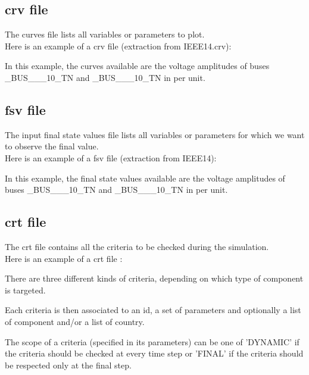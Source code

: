 \documentclass[a4paper, 12pt]{report}
\begin{document}
\subsection{crv file}

The curves file lists all variables or parameters to plot. \\

Here is an example of a crv file (extraction from IEEE14.crv):


In this example, the curves available are the voltage amplitudes of buses \_BUS\_\_\_10\_TN and \_BUS\_\_\_10\_TN in per unit.

\subsection{fsv file}

The input final state values file lists all variables or parameters for which we want to observe the final value. \\

Here is an example of a fsv file (extraction from IEEE14):


In this example, the final state values available are the voltage amplitudes of buses \_BUS\_\_\_10\_TN and \_BUS\_\_\_10\_TN in per unit.

\subsection{crt file}

The crt file contains all the criteria to be checked during the
simulation.
\\

Here is an example of a crt file :


There are three different kinds of criteria, depending on which type of
component is targeted.

Each criteria is then associated to an id, a set of parameters and optionally a
list of component and/or a list of country.

The scope of a criteria (specified in its parameters) can be one of 'DYNAMIC' if
the criteria should be checked at every time step or 'FINAL' if the criteria
should be respected only at the final step.
\end{document}
